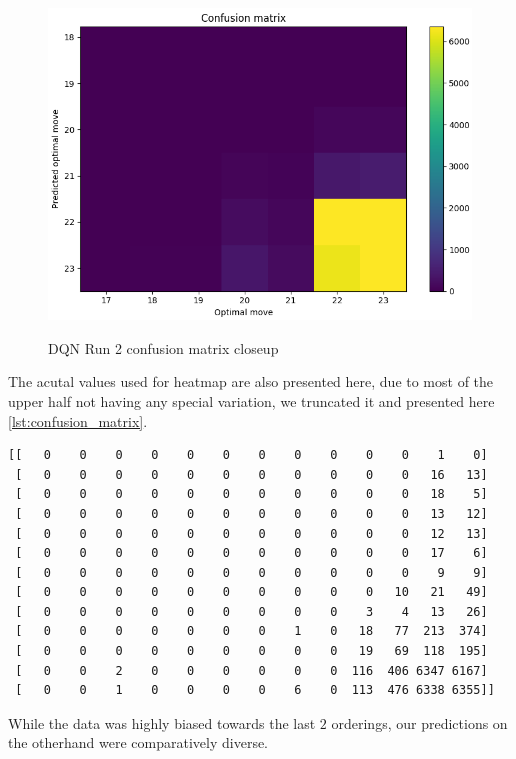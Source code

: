 \begin{figure}
\centering
\includegraphics[scale=0.6]{cm4.png}\\
\caption{DQN Run 2 confusion matrix closeup}
\label{fig:dqn_r2_2}
\end{figure}

The acutal values used for heatmap are also presented here, due to most of the upper half not having any special variation, we truncated it and presented here \ref{lst:confusion_matrix}.

\begin{lstlisting}[caption=Confusion matrix for DQN classificaiton, label={lst:confusion_matrix}]
[[   0    0    0    0    0    0    0    0    0    0    0    1    0]
 [   0    0    0    0    0    0    0    0    0    0    0   16   13]
 [   0    0    0    0    0    0    0    0    0    0    0   18    5]
 [   0    0    0    0    0    0    0    0    0    0    0   13   12]
 [   0    0    0    0    0    0    0    0    0    0    0   12   13]
 [   0    0    0    0    0    0    0    0    0    0    0   17    6]
 [   0    0    0    0    0    0    0    0    0    0    0    9    9]
 [   0    0    0    0    0    0    0    0    0    0   10   21   49]
 [   0    0    0    0    0    0    0    0    0    3    4   13   26]
 [   0    0    0    0    0    0    0    1    0   18   77  213  374]
 [   0    0    0    0    0    0    0    0    0   19   69  118  195]
 [   0    0    2    0    0    0    0    0    0  116  406 6347 6167]
 [   0    0    1    0    0    0    0    6    0  113  476 6338 6355]]
\end{lstlisting}
While the data was highly biased towards the last $2$ orderings, our predictions on the otherhand were comparatively diverse.


